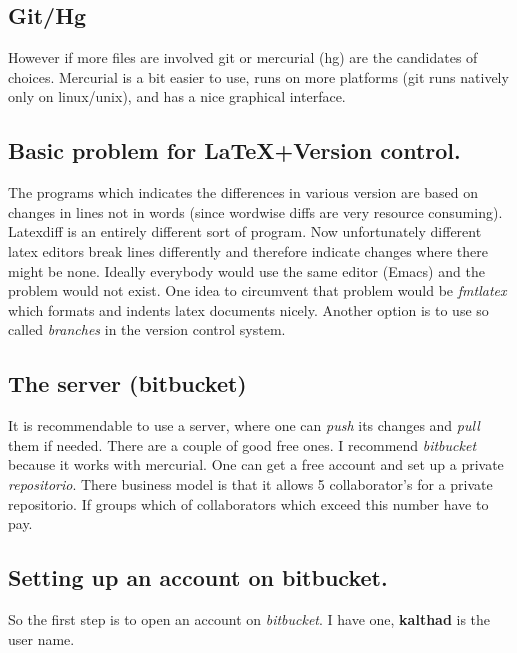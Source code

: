 \documentclass[11pt]{article}
\begin{document}
\subsection{Git/Hg}
\label{sec:orgheadline7}

However if more files are involved git or
mercurial (hg) are the candidates of choices. Mercurial is a bit
easier to use, runs on more platforms (git runs natively only on
linux/unix), and has a nice graphical interface.

\subsection{Basic problem for \LaTeX{}+Version control.}
\label{sec:orgheadline8}

The programs which indicates the differences in various version are
based on changes in lines not in words (since wordwise diffs are very
resource consuming). Latexdiff is an entirely different sort of
program. Now unfortunately different latex editors break lines
differently and therefore indicate changes where there might be none.
Ideally everybody would use the same editor (Emacs) and the problem
would not exist. One idea to circumvent that problem would be
\emph{fmtlatex} which formats and indents latex documents nicely. Another
option is to use so called \emph{branches} in the version control system.

\subsection{The server (bitbucket)}
\label{sec:orgheadline9}

It is recommendable to use a server, where one can \emph{push} its changes
and \emph{pull} them if needed. There are a couple of good free ones. I
recommend \emph{bitbucket} because it works with mercurial. One can get a
free account and set up a private \emph{repositorio}. There business model
is that it allows 5 collaborator's for a private repositorio. If
groups which of collaborators which exceed this number have to pay. 

\subsection{Setting up an account on bitbucket.}
\label{sec:orgheadline10}

So the first step is to open an account on \emph{bitbucket}. I have one,
\textbf{kalthad} is the user name.
\end{document}
